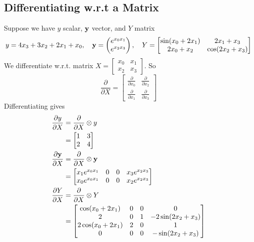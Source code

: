 \subsection{Differentiating w.r.t a Matrix}
Suppose we have $y$ scalar, $\textbf{y}$ vector, and $Y$ matrix
$$y = 4x_3 + 3x_2 + 2x_1 + x_0, \quad \textbf{y} = \begin{pmatrix}
    e^{x_0x_1} \\ e^{x_2x_3}
\end{pmatrix}, \quad Y = \begin{bmatrix}
    \sin(x_0 + 2x_1) & 2x_1 + x_3 \\
    2x_0 + x_2 & \cos(2x_2 + x_3)
\end{bmatrix}$$
We differentiate w.r.t. matrix $X = \begin{bmatrix}
    x_0 & x_1 \\ x_2 & x_3
\end{bmatrix}$. So $$\frac{\partial}{\partial X} = \begin{bmatrix}
    \frac{\partial}{\partial x_0} & \frac{\partial}{\partial x_2} \\ \frac{\partial}{\partial x_1} & \frac{\partial}{\partial x_3}
\end{bmatrix}$$
Differentiating gives
\begin{align*}
    \frac{\partial y}{\partial X} &= \frac{\partial}{\partial X} \otimes y \\
    &= \begin{bmatrix}
        1 & 3 \\
        2 & 4 
    \end{bmatrix} \\
    \frac{\partial \textbf{y}}{\partial X} &= \frac{\partial}{\partial X} \otimes \textbf{y} \\
     &= \begin{bmatrix}
        x_1e^{x_0x_1} & 0 & 0 & x_3e^{x_2x_3} \\
        x_0e^{x_0x_1} & 0 & 0 & x_2e^{x_2x_3}
     \end{bmatrix} \\
    \frac{\partial Y}{\partial X} &= \frac{\partial}{\partial X} \otimes Y \\
    &= \begin{bmatrix}
        \cos(x_0 + 2x_1) & 0 & 0 & 0 \\
        2 & 0 & 1 & -2\sin(2x_2 + x_3) \\
        2\cos(x_0 + 2x_1) & 2 & 0 & 1 \\
        0 & 0 & 0 & -\sin(2x_2 + x_3)
    \end{bmatrix}
\end{align*}